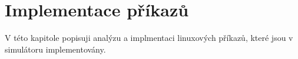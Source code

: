
\chapter{Implementace příkazů}

V této kapitole popisuji analýzu a implmentaci linuxových příkazů, které jsou v simulátoru implementovány. 